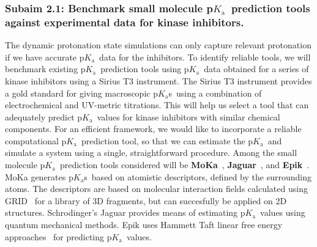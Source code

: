\documentclass[10pt,final]{article}
\newcommand{\pKa}{p$K_\mathrm{a}$\ }
\newcommand{\pKas}{p$K_\mathrm{a}$s\ }
\begin{document}
\subsubsection*{Subaim 2.1: Benchmark small molecule \pKa prediction tools against experimental data for kinase inhibitors.}
The dynamic protonation state simulations can only capture relevant protonation if we have accurate \pKa data for the inhibitors.
%
To identify reliable tools, we will benchmark existing \pKa prediction tools using \pKa data obtained for a series of kinase inhibitors using a Sirius T3 instrument.
%
The Sirius T3 instrument provides a gold standard for giving macroscopic \pKas using a combination of electrochemical and UV-metric titrations.
%
This will help us select a tool that can adequately predict \pKa values for kinase inhibitors with similar chemical components.
%
For an efficient framework, we would like to incorporate a reliable computational \pKa prediction tool, so that we can estimate the \pKa and simulate a system using a single, straightforward procedure.
%
Among the small molecule \pKa prediction tools considered will be \textbf{MoKa}~\autocite{Milletti2007a}, \textbf{Jaguar}~\autocite{Bochevarov2013a}, and \textbf{Epik}~\autocite{Shelley2007a,Greenwood2010a}.
%
MoKa generates \pKas based on atomistic descriptors, defined by the surrounding atoms.
%
The descriptors are based on molecular interaction fields calculated using GRID~\autocite{Goodford1985a} for a library of 3D fragments, but can succesfully be applied on 2D structures.
%
Schrodinger's Jaguar provides means of estimating \pKa values using quantum mechanical methods.
%
Epik uses Hammett Taft linear free energy approaches~\autocite{Perrin1981a} for predicting \pKa values.
\end{document}
